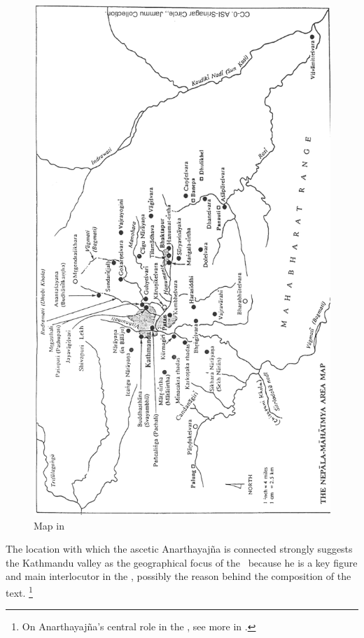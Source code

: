 \begin{figure}[!]
\includegraphics[scale=.40]{images/map_in_jayaraj.png}
\caption[Map in ]{Map in 
\label{fig:map02}}
\end{figure}


The location with which the ascetic Anarthayajña
is connected strongly suggests the Kathmandu 
valley as the geographical focus of the \VSS\
because he is a key figure and 
main interlocutor in the \VSS,
possibly the reason behind the composition of the text.%
	\footnote{On Anarthayajña's central role in the \VSS,
			see more in .}


